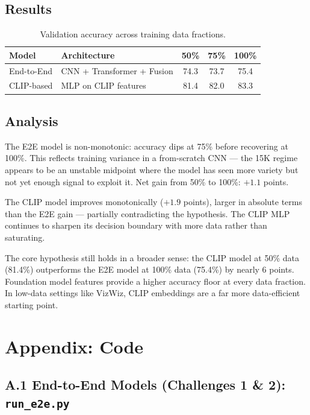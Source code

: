 \documentclass[11pt]{article}
\begin{document}
\subsection{Results}

\begin{table}[h]
  \centering
  \caption{Validation accuracy across training data fractions.}
  \label{tab:data_eff}
  \begin{tabular}{llccc}
    \toprule
    \textbf{Model} & \textbf{Architecture} & \textbf{50\%} & \textbf{75\%} & \textbf{100\%} \\
    \midrule
    End-to-End & CNN + Transformer + Fusion & 74.3 & 73.7 & 75.4 \\
    CLIP-based & MLP on CLIP features       & 81.4 & 82.0 & 83.3 \\
    \bottomrule
  \end{tabular}
\end{table}

\subsection{Analysis}

The E2E model is non-monotonic: accuracy dips at 75\% before recovering at 100\%. This
reflects training variance in a from-scratch CNN — the 15K regime appears to be an
unstable midpoint where the model has seen more variety but not yet enough signal to
exploit it. Net gain from 50\% to 100\%: $+1.1$ points.

The CLIP model improves monotonically ($+1.9$ points), larger in absolute terms than the
E2E gain — partially contradicting the hypothesis. The CLIP MLP continues to sharpen
its decision boundary with more data rather than saturating.

The core hypothesis still holds in a broader sense: the CLIP model at 50\% data (81.4\%)
outperforms the E2E model at 100\% data (75.4\%) by nearly 6 points. Foundation model
features provide a higher accuracy floor at every data fraction. In low-data settings
like VizWiz, CLIP embeddings are a far more data-efficient starting point.

\clearpage
\appendix
\section*{Appendix: Code}

\subsection*{A.1 End-to-End Models (Challenges 1 \& 2): \texttt{run\_e2e.py}}
\end{document}
